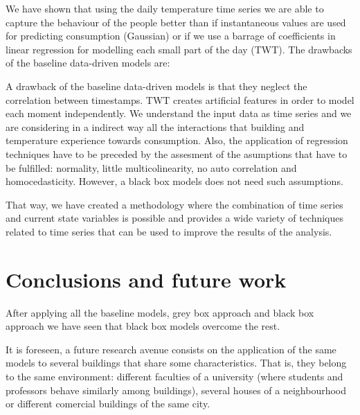 \documentclass[10pt, conference, compsocconf]{IEEEtran}
\begin{document}

We have shown that using the daily temperature time series we are able to capture the behaviour of the people better than if instantaneous values are used for predicting consumption (Gaussian) or if we use a barrage of coefficients in linear regression for modelling each small part of the day (TWT). The drawbacks of the baseline data-driven models are:


A drawback of the baseline data-driven models is that they neglect the correlation between timestamps. TWT creates artificial features in order to model each moment independently. We understand the input data as time series and we are considering in a indirect way all the interactions that building and temperature experience towards consumption.
Also, the application of regression techniques have to be preceded by the assesment of the asumptions that have to be fulfilled: normality, little multicolinearity, no auto correlation and homocedasticity. However, a black box models does not need such assumptions.


That way, we have created a methodology where the combination of time series and current state variables is possible and provides a wide variety of techniques related to time series that can be used to improve the results of the analysis.

\section{Conclusions and future work}

After applying all the baseline models, grey box approach and black box approach we have seen that black box models overcome the rest.



It is foreseen, a future research avenue consists on the application of the same models to several buildings that share some characteristics. That is, they belong to the same environment: different faculties of a university (where students and professors behave similarly among buildings), several houses of a neighbourhood or different comercial buildings of the same city.
\end{document}

